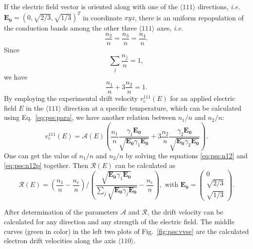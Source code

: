 If the electric field vector is oriented along with one of the $\langle 111 \rangle$ directions, \textit{i.e.} $\mathbf{E_{0}} = (0, \sqrt{2/3}, \sqrt{1/3})^{T}$ in coordinate $xyz$, there is an uniform repopulation of the conduction bands among the other three $\langle 111 \rangle$ axes, \textit{i.e.}
\begin{equation}
\label{eq:pss:n111}
\frac{n_{2}}{n} = \frac{n_{3}}{n} = \frac{n_{4}}{n}.
\end{equation}
Since
\begin{equation}
\label{eq:pss:nsum}
\displaystyle \sum_{j}\frac{n_{j}}{n} = 1,
\end{equation}
we have
\begin{equation}
\label{eq:pss:n12}
\frac{n_{1}}{n} + 3\frac{n_{2}}{n}= 1.
\end{equation}
By employing the experimental drift velocity $v_{e}^{111}(E)$ for an applied electric field $E$ in the $\langle 111 \rangle$ direction at a specific temperature, which can be calculated using Eq.~\ref{eq:pss:para}, we have another relation between $n_{1}/n$ and $n_{2}/n$:
\begin{equation}
\label{eq:pss:n12p}
v_{e}^{111}(E) =  \mathcal{A}(E) \left(  \frac{n_{1}}{n} \frac{\gamma_{1}\mathbf{E_{0}}}         {\sqrt{\mathbf{E_{0}}\gamma_{1}\mathbf{E_{0}}}} +  3\frac{n_{2}}{n} \frac{\gamma_{2}\mathbf{E_{0}}}         {\sqrt{\mathbf{E_{0}}\gamma_{2}\mathbf{E_{0}}}} \right).
\end{equation}
One can get the value of $n_{1}/n$ and $n_{2}/n$ by solving the equations \ref{eq:pss:n12} and \ref{eq:pss:n12p} together. Then $\mathcal{R}(E)$ can be calculated as
\begin{equation}
\label{eq:pss:re}
\mathcal{R}(E) = \left( \frac{n_{1}}{n} - \frac{n_{e}}{n} \right) / \left( \frac{\sqrt{\mathbf{E_{0}}\gamma_{1}\mathbf{E_{0}}}}
{\sum_{j}\sqrt{\mathbf{E_{0}}\gamma_{j}\mathbf{E_{0}}}} -       \frac{n_{e}}{n} \right), \mbox{ with } \mathbf{E_{0}} = \left( \begin{array}{c} 
0\\ \sqrt{2/3}\\\sqrt{1/3} \end{array} \right).
\end{equation}

After determination of the parameters $\mathcal{A}$ and $\mathcal{R}$, the drift velocity can be calculated for any direction and any strength of the electric field. The middle curves (green in color) in the left two plots of Fig.~\ref{fig:pss:vvse} are the calculated electron drift velocities along the axis $\langle 110 \rangle$.

